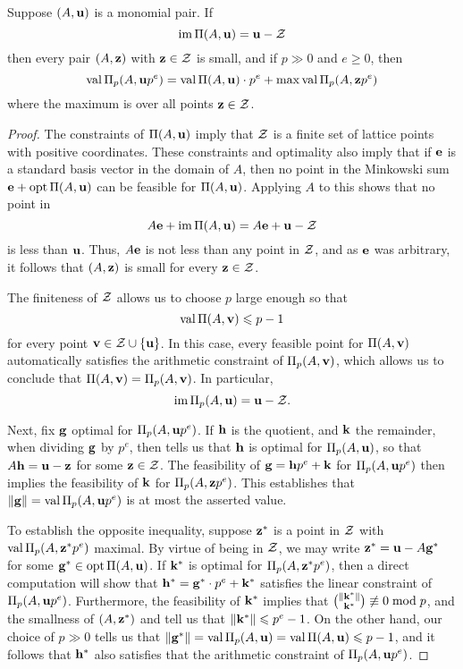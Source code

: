 \documentclass[11pt]{amsart}
\begin{document}
\begin{proposition}
Suppose $(A, \mathbf{u})$ is a monomial pair.  If \[ \operatorname{im} \Pi(A, \mathbf{u}) = \mathbf{u} - \mathcal{Z}\] then every pair $(A, \mathbf{z})$ with $\mathbf{z} \in \mathcal{Z}$ is small, and if $p \gg 0$ and $e \geq 0$, then 
\[ \operatorname{val} \Pi_p(A, \mathbf{u} p^e) = \operatorname{val} \Pi(A, \mathbf{u}) \cdot p^e + \max \operatorname{val} \Pi_p(A, \mathbf{z}p^e) \]
where the maximum is over all points $\mathbf{z} \in \mathcal{Z}$.
\end{proposition}

\begin{proof}  The constraints of $\Pi(A, \mathbf{u})$ imply that $\mathcal{Z}$ is a finite set of lattice points with positive coordinates.   These constraints and optimality also imply that if $\mathbf{e}$ is a standard basis vector in the domain of $A$, then no point in the Minkowski sum $\mathbf{e} + \operatorname{opt} \Pi(A, \mathbf{u})$ can be feasible for $\Pi(A, \mathbf{u})$.  Applying $A$ to this shows that no point in 
\[ A \mathbf{e} + \operatorname{im} \Pi(A, \mathbf{u}) = A \mathbf{e} + \mathbf{u} - \mathcal{Z} \] 
is less than $\mathbf{u}$.  Thus, $A \mathbf{e}$ is not less than any point in $\mathcal{Z}$, and as $\mathbf{e}$ was arbitrary, it follows that $(A, \mathbf{z})$ is small for every $\mathbf{z} \in \mathcal{Z}$.

The finiteness of $\mathcal{Z}$ allows us to choose $p$ large enough so that \[ \operatorname{val} \Pi(A, \mathbf{v}) \leqslant p -1 \] for every point $\mathbf{v} \in \mathcal{Z} \cup \{ \mathbf{u} \}$.  In this case, every feasible point for $\Pi(A, \mathbf{v})$  automatically satisfies the arithmetic constraint of $\Pi_p(A, \mathbf{v})$, which allows us to conclude that $\Pi(A, \mathbf{v}) = \Pi_p(A, \mathbf{v})$.  In particular, \[ \operatorname{im} \Pi_p(A, \mathbf{u}) =\mathbf{u} - \mathcal{Z}. \] 

Next, fix $\mathbf{g}$ optimal for $\Pi_p(A, \mathbf{u}p^e)$.  If $\mathbf{h}$ is the quotient, and $\mathbf{k}$ the remainder, when dividing $\mathbf{g}$ by $p^e$, then  tells us that $\mathbf{h}$ is optimal for $\Pi_p(A, \mathbf{u})$, so that $A \mathbf{h} = \mathbf{u}-\mathbf{z}$ for some $\mathbf{z} \in \mathcal{Z}$.  The feasibility of $\mathbf{g}=\mathbf{h}p^e + \mathbf{k}$ for $\Pi_p(A, \mathbf{u}p^e)$ then implies the feasibility of $\mathbf{k}$ for $\Pi_p(A, \mathbf{z}p^e)$.  This establishes that $\| \mathbf{g} \| = \operatorname{val} \Pi_p(A, \mathbf{u}p^e)$ is at most the asserted value.

To establish the opposite inequality, suppose $\mathbf{z}^{\ast}$ is a point in $\mathcal{Z}$ with $\operatorname{val} \Pi_p(A, \mathbf{z}^{\ast} p^e)$ maximal.  By virtue of being in $\mathcal{Z}$, we may write $\mathbf{z}^{\ast} = \mathbf{u} - A \mathbf{g}^{\ast}$ for some $\mathbf{g}^{\ast} \in \operatorname{opt} \Pi(A, \mathbf{u})$.  If $\mathbf{k}^{\ast}$ is optimal for $\Pi_p(A, \mathbf{z}^{\ast} p^e)$, then a direct computation will show that 
$\mathbf{h}^{\ast} = \mathbf{g}^{\ast} \cdot p^e + \mathbf{k}^{\ast}$ satisfies the linear constraint of  $\Pi_p(A, \mathbf{u}p^e)$.  Furthermore, the feasibility of $\mathbf{k}^{\ast}$ implies that $\binom{\| \mathbf{k}^{\ast} \|}{\mathbf{k}^{\ast}} \not \equiv 0 \bmod p$, and the smallness of $(A, \mathbf{z}^{\ast})$ and  tell us that $\| \mathbf{k}^{\ast} \| \leqslant p^e-1$.  On the other hand, our choice of $p \gg 0$ tells us that $\| \mathbf{g}^{\ast} \| = \operatorname{val} \Pi_p(A, \mathbf{u}) = \operatorname{val} \Pi(A, \mathbf{u}) \leqslant p-1$, and it follows that $\mathbf{h}^{\ast}$ also satisfies that the arithmetic constraint of $\Pi_p(A, \mathbf{u}p^e)$.
\end{proof}
\end{document}
